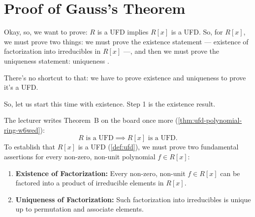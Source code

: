 \begin{hidden}
\end{hidden}

\section{Proof of Gauss's Theorem}

\begin{speech}[00:20:34 - 00:21:44]
Okay, so, we want to prove: $R$ is a UFD implies $R[x]$ is a UFD.  So, for $R[x]$, we must prove two things: we must prove the existence statement --- existence of factorization into irreducibles in $R[x]$  ---, and then we must prove the uniqueness statement: uniqueness .

There's no shortcut to that: we have to prove existence and uniqueness to prove it's a UFD.

So, let us start this time with existence. Step 1 is the existence result. 
\end{speech}

\begin{content}
The lecturer writes Theorem~B on the board once more (\cref{thm:ufd-polynomial-ring-w6wed}):
\[
R \text{ is a UFD} \implies R[x] \text{ is a UFD}.
\]
To establish that $R[x]$ is a UFD (\cref{def:ufd}), we must prove two fundamental assertions for every non-zero, non-unit polynomial $f \in R[x]$:
\begin{enumerate}[label=\textbf{(\arabic*)}]
    \item \textbf{Existence of Factorization:} Every non-zero, non-unit $f \in R[x]$ can be factored into a product of irreducible elements in $R[x].$
    \item \textbf{Uniqueness of Factorization:} Such factorization into irreducibles is unique up to permutation and associate elements.
\end{enumerate}
\end{content}

